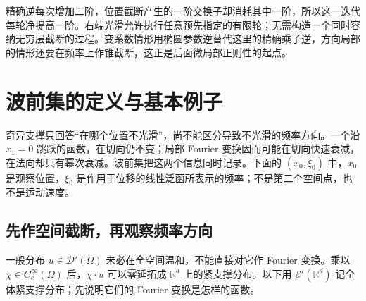 精确逆每次增加二阶，位置截断产生的一阶交换子却消耗其中一阶，所以这一迭代每轮净提高一阶。右端光滑允许执行任意预先指定的有限轮；无需构造一个同时容纳无穷层截断的过程。变系数情形用椭圆参数逆替代这里的精确乘子逆，方向局部的情形还要在频率上作锥截断，这正是后面微局部正则性的起点。

\section{波前集的定义与基本例子}
\label{b2:sec:app-G-4}

奇异支撑只回答“在哪个位置不光滑”，尚不能区分导致不光滑的频率方向。一个沿 \(x_1=0\) 跳跃的函数，在切向仍不变；局部 Fourier 变换因而可能在切向快速衰减，在法向却只有幂次衰减。波前集把这两个信息同时记录。下面的 \((x_0,\xi_0)\) 中，\(x_0\) 是观察位置，\(\xi_0\) 是作用于位移的线性泛函所表示的频率；不是第二个空间点，也不是运动速度。

\subsection{先作空间截断，再观察频率方向}
\label{b2:subsec:G0401}

一般分布 \(u\in\mathcal D'(\Omega)\) 未必在全空间温和，不能直接对它作 Fourier 变换。乘以 \(\chi\in C_c^\infty(\Omega)\) 后，\(\chi\cdot u\) 可以零延拓成 \(\mathbb R^d\) 上的紧支撑分布。以下用 \(\mathcal E'(\mathbb R^d)\) 记全体紧支撑分布；先说明它们的 Fourier 变换是怎样的函数。

